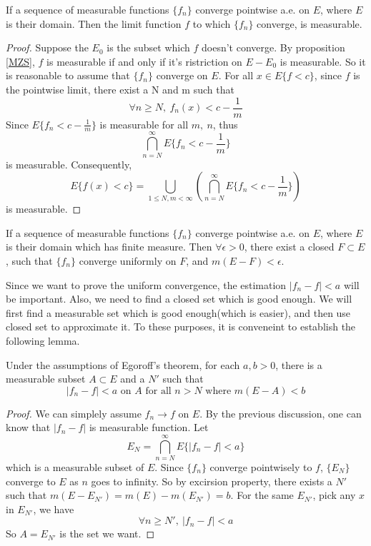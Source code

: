 \documentclass[lang=en, 12pt]{elegantbook}
\begin{document}
            \begin{proposition}
                If a sequence of measurable functions $\{f_n\}$ converge pointwise a.e. on $E$, where $E$ is their domain. Then the limit 
            function $f$ to which $\{f_n\}$ converge, is measurable.     
            \end{proposition}
            \begin{proof}
                Suppose the $E_0$ is the subset which $f$ doesn't converge. By proposition \ref{MZS}, $f$ is measurable if and only if it's 
            ristriction on $E - E_0$ is measurable. So it is reasonable to assume that $\{f_n\}$ converge on $E$. 
                For all $x \in E\{f< c\}$, since $f$ is the pointwise limit, there exist a N and m such that 
            $$\forall n \geq N, \ f_n(x) < c - \frac{1}{m}$$
                Since $E\{f_n< c-\frac{1}{m}\}$ is measurable for all $m, \ n$, thus 
            $$\bigcap_{n=N}^{\infty} E\{f_n < c -\frac{1}{m}\}$$
            is measurable. Consequently, 
            $$E\{f(x)<c\} = \bigcup_{1 \leq N, m < \infty}(\bigcap_{n=N}^{\infty} E\{f_n < c -\frac{1}{m}\})$$
            is measurable. 
            \end{proof}
            \begin{theorem}
                If a sequence of measurable functions $\{f_n\}$ converge pointwise a.e. on $E$, where $E$ is their domain which has finite
            measure. Then $\forall \epsilon > 0$, there exist a closed $F \subset E$, such that $\{f_n\}$ converge uniformly on $F$, and
            $m(E-F) < \epsilon$. 
            \end{theorem}
            Since we want to prove the uniform convergence, the estimation $|f_n - f|< a$ will be important. Also, we need to find a closed
        set which is good enough. We will first find a measurable set which is good enough(which is easier), and then use closed set to approximate it. 
        To these purposes, it is conveneint to establish the following lemma.
            \begin{lemma}
                Under the assumptions of Egoroff's theorem, for each $a, b > 0 $, there is a measurable subset $A \subset E$ and a $N'$ such
            that 
            $$|f_n - f| < a \mbox{ on $A$ for all $n>N$ where } m(E -A) <b $$
            \end{lemma}
            \begin{proof}
                We can simplely assume $f_n \to f$ on $E$. By the previous discussion, one can know that $|f_n-f|$ is measurable function. 
            Let $$E_N = \bigcap_{n=N}^{\infty} E\{|f_n-f|<a\}$$
            which is a measurable subset of $E$. Since $\{f_n\}$ converge pointwisely to $f$, $\{E_N\}$ converge to $E$ as $n$ goes 
            to infinity. So by excirsion property, there exists a $N'$ such that $m(E - E_{N'}) = m(E) - m(E_{N'}) = b$. For the same $E_{N'}$, pick any $x$ in $E_{N'}$, we have 
            $$\forall n \geq N', \ |f_n - f| < a$$ 
            So $A = E_{N'}$ is the set we want. 
            \end{proof}
\end{document}

